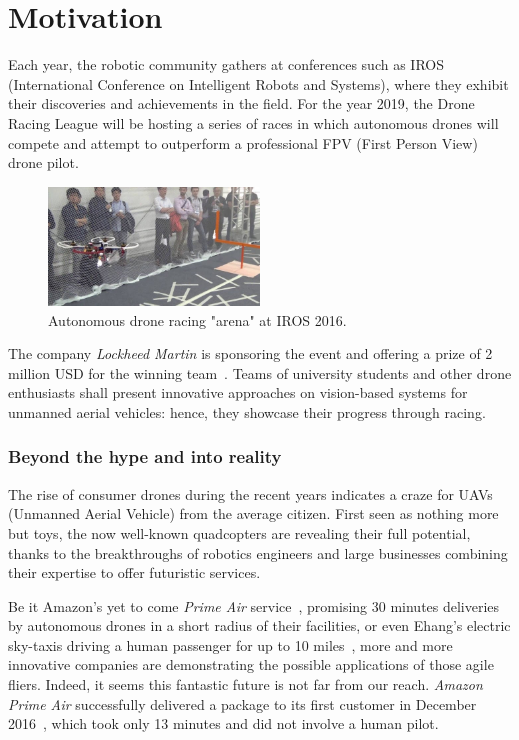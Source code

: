 \section{Motivation}
Each year, the robotic community gathers at conferences such as IROS
(International Conference on Intelligent Robots and Systems), where they
exhibit their discoveries and achievements in the field. For the year 2019, the
Drone Racing League will be hosting a series of races in which autonomous drones
will compete and attempt to outperform a professional FPV (First Person View)
drone pilot.\\

\begin{figure}[h]
	\centering
	\includegraphics[width=0.5\textwidth]{figure/iros_2016.jpg}
	\caption{Autonomous drone racing "arena" at IROS 2016.}
	\label{fig:iros}
\end{figure}

The company \emph{Lockheed Martin} is sponsoring the event and offering a prize of 2
million USD for the winning team~\cite{LockheedDRL}. Teams of university
students and other drone enthusiasts shall present innovative approaches on
vision-based systems for unmanned aerial vehicles: hence, they showcase their
progress through racing.\\

\subsubsection{Beyond the hype and into reality}
The rise of consumer drones during the recent years indicates a craze for UAVs
(Unmanned Aerial Vehicle) from the average citizen. First seen as nothing more
but toys, the now well-known quadcopters are revealing their full potential,
thanks to the breakthroughs of robotics engineers and large businesses combining
their expertise to offer futuristic services.

Be it Amazon's yet to come \emph{Prime Air} service~\cite{PrimeAir}, promising
30 minutes deliveries by autonomous drones in a short radius of their
facilities, or even Ehang's electric sky-taxis driving a human passenger for up
to 10 miles~\cite{Ehang184}, more and more innovative companies are
demonstrating the possible applications of those agile fliers.  Indeed, it seems
this fantastic future is not far from our reach. \emph{Amazon Prime Air}
successfully delivered a package to its first customer in December
2016~\cite{PrimeAirFirst}, which took only 13 minutes and did not involve a
human pilot.\\

